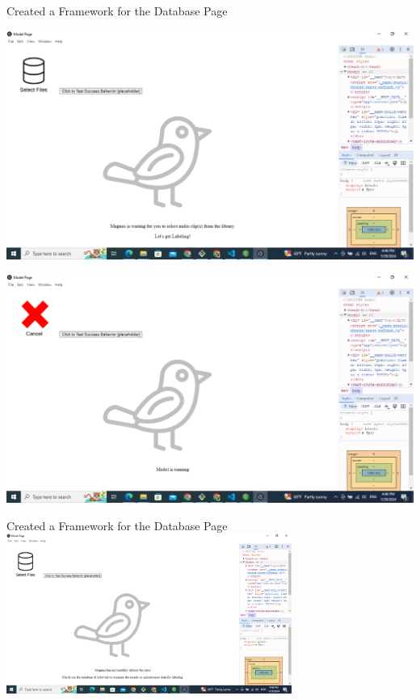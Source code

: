 \begin{frame}{Created a Framework for the Database Page}
       \centering
       \begin{minipage}{0.45\textwidth}
            \centering
            \includegraphics[width=\linewidth]{database1.png}
        \end{minipage}
        \hfill
        \begin{minipage}{0.45\textwidth}
            \centering
            \includegraphics[width=\linewidth]{database2.png}
        \end{minipage}  
\end{frame}

\begin{frame}{Created a Framework for the Database Page}
    \centering
    \includegraphics[height=0.7\textheight,width=0.7\textwidth,keepaspectratio]{database3.png}  
\end{frame}

